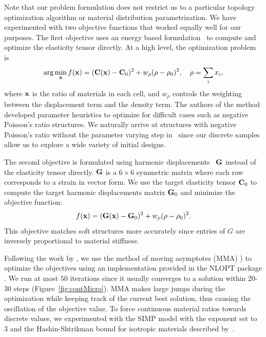 Note that our problem formulation does not restrict us to a particular topology optimization algorithm or material distribution parametrization. We have experimented with two objective functions that worked equally well for our purposes.
The first objective uses an energy based formulation~\cite{xia:2015:design} to compute and optimize the elasticity tensor directly. At a high level, the optimization problem is
\begin{equation}
\arg\min_{\mathbf{x}} f(\mathbf{x}) = (\mathbf{C}(\mathbf{x})-\mathbf{C}_0)^2 + w_{\rho}(\rho-\rho_0)^2, \quad \rho = \sum_{i} x_{i} ,
\end{equation}
where $\mathbf{x}$ is the ratio of materials in each cell, and $w_{\rho}$ controls the weighting between the displacement term and the density term.
The authors of the method developed parameter heuristics to optimize for difficult cases such as negative Poisson's ratio structures. We naturally arrive at structures with negative Poisson's ratio without the parameter varying step in~\cite{xia:2015:design} since our discrete samples allow us to explore a wide variety of initial designs.

The second objective is formulated using harmonic displacements~\citep{Kharevych2009,Schumacher:2015} $\mathbf{G}$ instead of the elasticity tensor directly. $\mathbf{G}$ is a $6\times 6$ symmetric matrix where each row corresponds to a strain in vector form. We use the target elasticity tensor $\mathbf{C}_0$ to compute the target harmonic displacements matrix $\mathbf{G}_0$ and minimize the objective function:
\begin{equation}
f(\mathbf{x}) = (\mathbf{G}(\mathbf{x})-\mathbf{G}_0)^2 + w_{\rho}(\rho-\rho_0)^2.
\end{equation}
This objective matches soft structures more accurately since entries of $G$ are inversely proportional to material stiffness.

Following the work by \citet{andreassen2014design}, we use the method of moving asymptotes (MMA) \cite{svanberg1987method}) to optimize the objectives using an implementation provided in the NLOPT package \citep{johnson2014nlopt}. We run at most $50$ iterations since it usually converges to a solution within 20-30 steps (Figure~\ref{fig:contMicro}).
MMA makes large jumps during the optimization while keeping track of the current best solution, thus causing the oscillation of the objective value.
To force continuous material ratios towards discrete values, we experimented with the SIMP model with the exponent set to $3$ and the Hashin-Shtrikman bound for isotropic materials
described by~\citet{bendsoe1999material}.

